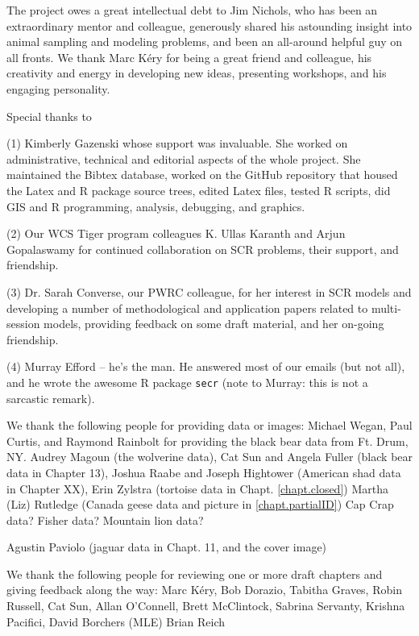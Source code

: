 
The project owes a great intellectual debt to Jim Nichols, who has
been an extraordinary mentor and colleague, generously shared his
astounding insight into animal sampling and modeling problems, and
been an all-around helpful guy on all fronts.  We thank Marc K\'{e}ry
for being a great friend and colleague, his creativity and energy in
developing new ideas, presenting workshops, and his engaging
personality.

Special thanks to

(1) Kimberly Gazenski whose support was invaluable. She worked on
administrative, technical and editorial aspects of the whole
project. She maintained the Bibtex database, worked on the GitHub
repository that housed the Latex and R package source trees, edited
Latex files, tested R scripts, did GIS and R programming, analysis,
debugging,  and graphics.

(2) Our WCS Tiger program colleagues K. Ullas Karanth and Arjun
Gopalaswamy for continued collaboration on SCR problems, their
support, and friendship.

(3) Dr. Sarah Converse, our PWRC colleague, for her interest in SCR
models and developing a number of methodological and application
papers related to multi-session models, providing feedback on some
draft material, and her on-going friendship.

(4) Murray Efford -- he's the man. He answered most of our emails (but not
all), and he wrote the awesome R package \mbox{\tt secr} (note to Murray: this
is not a sarcastic remark).


We thank the following people for providing data or images:
Michael Wegan, Paul Curtis, and Raymond Rainbolt for providing the black bear data from Ft. Drum, NY. 
Audrey Magoun (the wolverine data), 
Cat Sun and Angela Fuller (black bear data in Chapter 13),
Joshua Raabe and Joseph Hightower (American shad data in Chapter XX),
Erin Zylstra (tortoise data in Chapt. \ref{chapt.closed})
Martha (Liz) Rutledge (Canada geese data and picture in \ref{chapt.partialID})
Cap Crap data? Fisher data?  Mountain lion data?

Agustin Paviolo (jaguar data in Chapt. 11, and the cover image)

We thank the following people for reviewing one or more draft chapters
and giving feedback along the way:
Marc K\'{e}ry, 
Bob Dorazio,
Tabitha Graves,
Robin Russell,
Cat Sun,
Allan O'Connell,
Brett McClintock,
Sabrina Servanty,
Krishna Pacifici,
David Borchers (MLE)
Brian Reich
